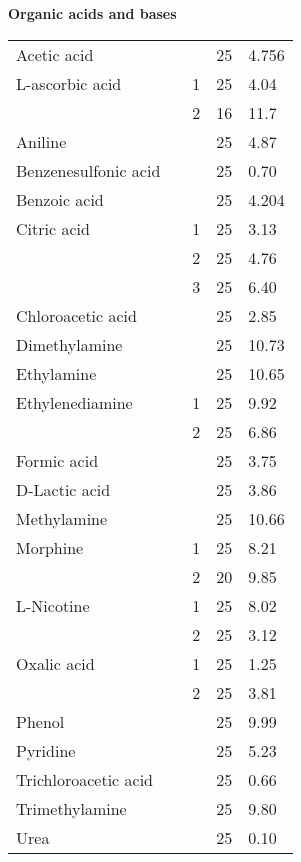 \documentclass[a4paper, 10pt]{article}
\begin{document}
\begin{center}
    \begin{large}
        \textbf{Organic acids and bases}
    \end{large}
\end{center}


\begin{footnotesize}
    \begin{supertabular}{lllll}
        Acetic acid &  & & 25 & \num{4,756} \\
        L-ascorbic acid &  & 1 & 25 & \num{4,04} \\
        & & 2 & 16 & \num{11,7} \\
        Aniline &  & & 25 & \num{4,87} \\
        Benzenesulfonic acid &  & & 25 & \num{0,70} \\
        Benzoic acid &  & & 25 & \num{4,204} \\
        Citric acid &  & 1 & 25 & \num{3,13} \\
        & & 2 & 25 & \num{4,76} \\
        & & 3 & 25 & \num{6,40} \\
        Chloroacetic acid &  & & 25 & \num{2,85} \\
        Dimethylamine &  & & 25 & \num{10,73} \\
        Ethylamine &  & & 25 & \num{10,65} \\
        Ethylenediamine &  & 1 & 25 & \num{9,92} \\
        & & 2 & 25 & \num{6,86} \\
        Formic acid &  & & 25 & \num{3,75} \\
        D-Lactic acid &  & & 25 & \num{3,86} \\
        Methylamine &  &  & 25 & \num{10,66} \\
        Morphine &  & 1 & 25 & \num{8,21} \\
        & & 2 & 20 & \num{9,85} \\
        L-Nicotine &  & 1 & 25 & \num{8,02} \\
        & & 2 & 25 & \num{3,12} \\
        Oxalic acid &  & 1 & 25 & \num{1,25} \\
        & & 2 & 25 & \num{3,81} \\
        Phenol &  & & 25 & \num{9,99} \\
        Pyridine &  & & 25 & \num{5,23} \\
        Trichloroacetic acid &  & & 25 & \num{0,66} \\
        Trimethylamine &  & & 25 & \num{9,80} \\
        Urea &  & & 25 & \num{0,10} \\
    \bottomrule
    \end{supertabular}
\end{footnotesize}
\end{document}

